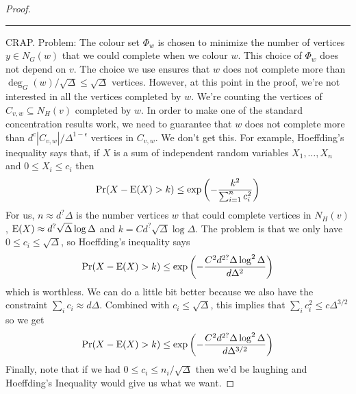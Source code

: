 \documentclass[kpfonts]{patmorin}
\begin{document}
\begin{proof}
  \hrule

  CRAP.  Problem: The colour set $\Phi_w$ is chosen to minimize the number of vertices $y\in N_G(w)$ that we could complete when we colour $w$.  This choice of $\Phi_w$ does not depend on $v$.   The choice we use ensures that $w$ does not complete more than $\deg_G(w)/\sqrt{\Delta}\le \sqrt{\Delta}$ vertices.  However, at this point in the proof, we're not interested in all the vertices completed by $w$.  We're counting the vertices of $C_{v,w}\subseteq N_H(v)$ completed by $w$.  In order to make one of the standard concentration results work, we need to guarantee that $w$ does not complete more than $d^c|C_{v,w}|/\Delta^{1-\epsilon}$ vertices in $C_{v,w}$.  We don't get this.  For example, Hoeffding's inequality says that, if $X$ is a sum of independent random variables $X_1,\ldots,X_n$ and $0\le X_i\le c_i$ then
  \[
    \Pr(X-\mathrm{E}(X) > k) \le \exp\left(-\frac{k^2}{\sum_{i=1}^n c_i^2}\right)
  \]
  For us, $n\approx d^?\Delta$ is the number vertices $w$ that could complete vertices in $N_H(v)$, $\mathrm{E}(X)\approx d^?\sqrt{\Delta}\log\Delta$ and $k=Cd^{?}\sqrt{\Delta}\log\Delta$.  The problem is that we only have $0\le c_i\le \sqrt{\Delta}$, so Hoeffding's inequality says
  \[  \Pr(X-\mathrm{E}(X)> k) \le \exp\left(-\frac{C^2d^{2?}\Delta\log^2\Delta}{d\Delta^{2}}\right)
  \]
  which is worthless.  We can do a little bit better because we also have the constraint $\sum_i c_i \approx d\Delta$.  Combined with $c_i\le \sqrt{\Delta}$, this implies that $\sum_{i} c_i^2 \le c\Delta^{3/2}$ so we get
  \[  \Pr(X-\mathrm{E}(X)> k) \le \exp\left(-\frac{C^2d^{2?}\Delta\log^2\Delta}{d\Delta^{3/2}}\right)
  \]
  Finally, note that if we had $0\le c_i\le n_i/\sqrt{\Delta}$ then we'd be laughing and Hoeffding's Inequality would give us what we want.



\end{proof}
\end{document}
